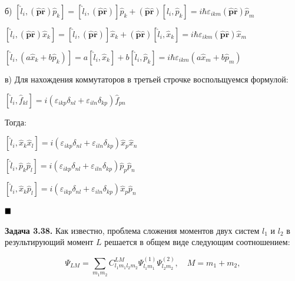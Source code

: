 \documentclass[a4paper, 12pt]{article}
\begin{document}
	\quad б) $\left[\hat{l}_i, \left(\hat{\mathbf{p}}\hat{\mathbf{r}}\right)\hat{p}_k\right] = \left[\hat{l}_i, \left(\hat{\mathbf{p}}\hat{\mathbf{r}}\right) \right] \hat{p}_k + \left(\hat{\mathbf{p}}\hat{\mathbf{r}}\right)\left[\hat{l}_i, \hat{p}_k\right] = i\hbar\varepsilon_{ikm} \left(\hat{\mathbf{p}}\hat{\mathbf{r}}\right) \hat{p}_m$
	
	$\left[\hat{l}_i, \left(\hat{\mathbf{p}}\hat{\mathbf{r}}\right)\hat{x}_k\right] = \left[\hat{l}_i, \left(\hat{\mathbf{p}}\hat{\mathbf{r}}\right) \right] \hat{x}_k + \left(\hat{\mathbf{p}}\hat{\mathbf{r}}\right)\left[\hat{l}_i, \hat{x}_k\right] = i\hbar\varepsilon_{ikm} \left(\hat{\mathbf{p}}\hat{\mathbf{r}}\right) \hat{x}_m $
	
	$\left[\hat{l}_i, \left(a\hat{x}_k + b\hat{p}_k\right)\right] = a\left[\hat{l}_i,\hat{x}_k \right] + b\left[\hat{l}_i, \hat{p}_k\right] = i\hbar\varepsilon_{ikm}(a\hat{x}_m + b\hat{p}_m) $
		
	\quad в) Для нахождения коммутаторов в третьей строчке воспольщуемся формулой:
	
	\begin{center}
		$\left[\hat{l}_i, \hat{f}_{kl}\right] = i\left(\varepsilon_{ikp} \delta_{nl} + \varepsilon_{iln}\delta_{kp}\right) \hat{f}_{pn} $
	\end{center}
	
	
	\quad Тогда:
	
	\begin{center}
		$\left[\hat{l}_i, \hat{x}_{k} \hat{x}_l \right] = i\left(\varepsilon_{ikp} \delta_{nl} + \varepsilon_{iln}\delta_{kp}\right) \hat{x}_{p} \hat{x}_n $
		
		$\left[\hat{l}_i, \hat{p}_{k} \hat{p}_l \right] = i\left(\varepsilon_{ikp} \delta_{nl} + \varepsilon_{iln}\delta_{kp}\right) \hat{p}_{p} \hat{p}_n $
		
		$\left[\hat{l}_i, \hat{x}_{k} \hat{p}_l \right] = i\left(\varepsilon_{ikp} \delta_{nl} + \varepsilon_{iln}\delta_{kp}\right) \hat{x}_{p} \hat{p}_n $
		
		$\newline\blacksquare$
	\end{center}
	
	\quad \textbf{Задача 3.38. } Как известно, проблема сложения моментов двух систем \( l_1 \) и \( l_2 \) в результирующий момент \( L \) решается в общем виде следующим соотношением:
	
	\[
	\Psi_{LM} = \sum_{m_1 m_2} C_{l_1 m_1 l_2 m_2}^{LM} \Psi_{l_1 m_1}^{(1)} \Psi_{l_2 m_2}^{(2)}, \quad M = m_1 + m_2,
	\]
	
\end{document}
